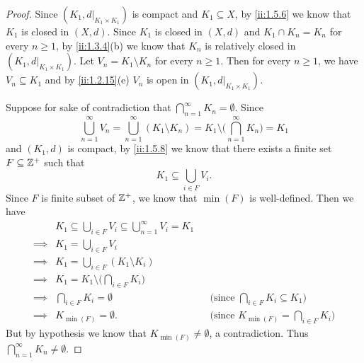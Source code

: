 \begin{proof}
  Since \((K_1, d|_{K_1 \times K_1})\) is compact and \(K_1 \subseteq X\), by \cref{ii:1.5.6} we know that \(K_1\) is closed in \((X, d)\).
  Since \(K_1\) is closed in \((X, d)\) and \(K_1 \cap K_n = K_n\) for every \(n \geq 1\), by \cref{ii:1.3.4}(b) we know that \(K_n\) is relatively closed in \((K_1, d|_{K_1 \times K_1})\).
  Let \(V_n = K_1 \setminus K_n\) for every \(n \geq 1\).
  Then for every \(n \geq 1\), we have \(V_n \subseteq K_1\) and by \cref{ii:1.2.15}(e) \(V_n\) is open in \((K_1, d|_{K_1 \times K_1})\).

  Suppose for sake of contradiction that \(\bigcap_{n = 1}^\infty K_n = \emptyset\).
  Since
  \[
    \bigcup_{n = 1}^\infty V_n = \bigcup_{n = 1}^\infty (K_1 \setminus K_n) = K_1 \setminus \bigg(\bigcap_{n = 1}^\infty K_n\bigg) = K_1
  \]
  and \((K_1, d)\) is compact, by \cref{ii:1.5.8} we know that there exists a finite set \(F \subseteq \mathbb{Z}^+\) such that
  \[
    K_1 \subseteq \bigcup_{i \in F} V_i.
  \]
  Since \(F\) is finite subset of \(\mathbb{Z}^+\), we know that \(\min(F)\) is well-defined.
  Then we have
  \begin{align*}
             & K_1 \subseteq \bigcup_{i \in F} V_i \subseteq \bigcup_{n = 1}^\infty V_i = K_1                                                             \\
    \implies & K_1 = \bigcup_{i \in F} V_i                                                                                                                \\
    \implies & K_1 = \bigcup_{i \in F} (K_1 \setminus K_i)                                                                                                \\
    \implies & K_1 = K_1 \setminus \bigg(\bigcap_{i \in F} K_i\bigg)                                                                                      \\
    \implies & \bigcap_{i \in F} K_i = \emptyset                                              &  & \text{(since \(\bigcap_{i \in F} K_i \subseteq K_1)\)} \\
    \implies & K_{\min(F)} = \emptyset.                                                       &  & \text{(since \(K_{\min(F)} = \bigcap_{i \in F} K_i)\)}
  \end{align*}
  But by hypothesis we know that \(K_{\min(F)} \neq \emptyset\), a contradiction.
  Thus \(\bigcap_{n = 1}^\infty K_n \neq \emptyset\).
\end{proof}

